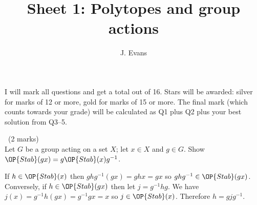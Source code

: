 \documentclass[12pt]{article}
\title{Sheet 1: Polytopes and group actions}
\author{J. Evans}
\date{}
\begin{document}
\maketitle

\bigskip

I will mark all questions and get a total out of 16. Stars will be awarded: silver for marks of 12 or more, gold for marks of 15 or more. The final mark (which counts towards your grade) will be calculated as Q1 plus Q2 plus your best solution from Q3--5.

\vspace{1cm}

\begin{question}\ (2 marks)\\
Let $G$ be a group acting on a set $X$; let $x\in X$ and $g\in G$. Show $\OP{Stab}(gx)=g\OP{Stab}(x)g^{-1}$.
\end{question}

\begin{answer}
If $h\in\OP{Stab}(x)$ then $ghg^{-1}(gx)=ghx=gx$ so $ghg^{-1}\in\OP{Stab}(gx)$. Conversely, if $h\in\OP{Stab}(gx)$ then let $j=g^{-1}hg$. We have $j(x)=g^{-1}h(gx)=g^{-1}gx=x$ so $j\in\OP{Stab}(x)$. Therefore $h=gjg^{-1}$.
\end{answer}
\newpage

\vspace{1cm}
\end{document}
